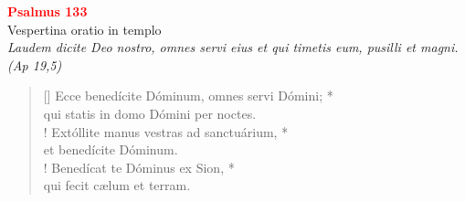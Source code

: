 


\def\greinitialformat#1{%
{\fontsize{39}{39}\selectfont #1}%
}




\vspace{0.3cm}
\begin{center}
 \textcolor{red}{\large \bf Psalmus 133}\\
Vespertina oratio in templo\\
\textit{\small Laudem dicite Deo nostro, omnes servi eius et qui timetis eum, pusilli et magni. (Ap 19,5)}
\end{center}
\begin{verse}[\versewidth]
Ecce benedícite Dóminum, omnes servi Dómini; *\\
qui statis in domo Dómini per noctes.\\!
\vin Extóllite manus vestras ad sanctuárium, *\\
\vin et benedícite Dóminum.\\!
Benedícat te Dóminus ex Sion, *\\
qui fecit cælum et terram.\\
\end{verse}
\vspace{1cm}


